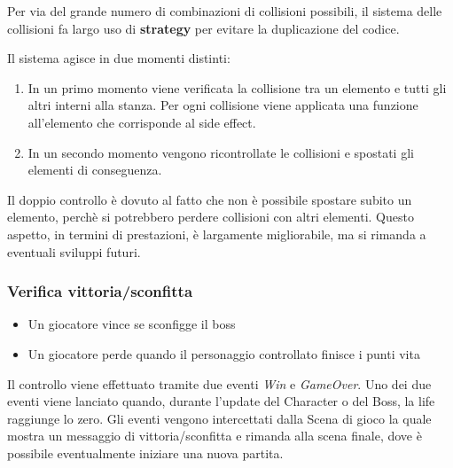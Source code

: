 Per via del grande numero di combinazioni di collisioni possibili, il sistema delle collisioni fa largo uso di \textbf{strategy} per evitare la duplicazione del codice. 

Il sistema agisce in due momenti distinti: 
\begin{enumerate}
  \item In un primo momento viene verificata la collisione tra un elemento e tutti gli altri interni alla stanza. Per ogni collisione viene applicata una funzione all'elemento che corrisponde al side effect.
  \item In un secondo momento vengono ricontrollate le collisioni e spostati gli elementi di conseguenza. 
\end{enumerate}

Il doppio controllo è dovuto al fatto che non è possibile spostare subito un elemento, perchè si potrebbero perdere collisioni con altri elementi.
Questo aspetto, in termini di prestazioni, è largamente migliorabile, ma si rimanda a eventuali sviluppi futuri.

\subsubsection{Verifica vittoria/sconfitta}
\begin{itemize}
  \item Un giocatore vince se sconfigge il boss
  \item Un giocatore perde quando il personaggio controllato finisce i punti vita
\end{itemize}

Il controllo viene effettuato tramite due eventi \textit{Win} e \textit{GameOver}. 
Uno dei due eventi viene lanciato quando, durante l'update del Character o del Boss, la life raggiunge lo zero. 
Gli eventi vengono intercettati dalla Scena di gioco la quale mostra un messaggio di vittoria/sconfitta e rimanda alla scena finale, dove è possibile eventualmente iniziare una nuova partita. 
